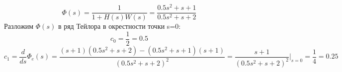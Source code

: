 \documentclass[a4paper, 11pt]{article}
\begin{document}
\begin{equation}
\varPhi(s) = \frac{1}{{1 + H(s)W(s)}} = \frac{{0.5{s^2} + s + 1}}{{0.5{s^2} + s + 2}}
\end{equation}
Разложим $\varPhi(s)$ в ряд Тейлора в окрестности точки s=0:
\[{c_0} = \frac{1}{2} = 0.5\]
\[{c_1} = \frac{d}{{ds}}{\Phi _e}(s) = \frac{{(s + 1)(0.5{s^2} + s + 2) - (0.5{s^2} + s + 1)(s + 1)}}{{{{(0.5{s^2} + s + 2)}^2}}} = \frac{{s + 1}}{{{{(0.5{s^2} + s + 2)}^2}}}{|_{s = 0}} = \frac{1}{4} = 0.25\]
\end{document}
